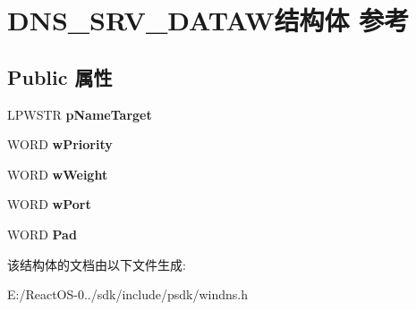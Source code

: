 \hypertarget{struct_d_n_s___s_r_v___d_a_t_a_w}{}\section{D\+N\+S\+\_\+\+S\+R\+V\+\_\+\+D\+A\+T\+A\+W结构体 参考}
\label{struct_d_n_s___s_r_v___d_a_t_a_w}
\subsection*{Public 属性}
\begin{DoxyCompactItemize}
\item 
\mbox{\label{struct_d_n_s___s_r_v___d_a_t_a_w_a6f5dc183b66cff143d3505235008d3e2}} 
L\+P\+W\+S\+TR {\bfseries p\+Name\+Target}
\item 
\mbox{\label{struct_d_n_s___s_r_v___d_a_t_a_w_a2c25885bf646249ea68441d84129f6e4}} 
W\+O\+RD {\bfseries w\+Priority}
\item 
\mbox{\label{struct_d_n_s___s_r_v___d_a_t_a_w_aa98d3286a5cc24bb45ed051812ecde8f}} 
W\+O\+RD {\bfseries w\+Weight}
\item 
\mbox{\label{struct_d_n_s___s_r_v___d_a_t_a_w_a340ecbcdda51059839958d3f2623c69a}} 
W\+O\+RD {\bfseries w\+Port}
\item 
\mbox{\label{struct_d_n_s___s_r_v___d_a_t_a_w_af56cafc9682a62dc8b2e9e747816ed2e}} 
W\+O\+RD {\bfseries Pad}
\end{DoxyCompactItemize}


该结构体的文档由以下文件生成\+:\begin{DoxyCompactItemize}
\item 
E\+:/\+React\+O\+S-\/0../sdk/include/psdk/windns.\+h\end{DoxyCompactItemize}
